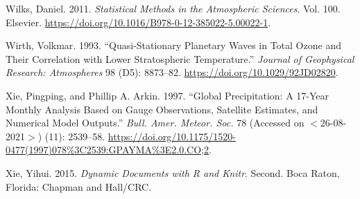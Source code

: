 \documentclass[smallextended]{svjour3}       %
\newlength{\cslhangindent}
\newlength{\cslentryspacingunit} %
\newenvironment{CSLReferences}[2] %
 {%
  \setlength{\parindent}{0pt}
  \ifodd #1
  \let\oldpar\par
  \def\par{\hangindent=\cslhangindent\oldpar}
  \fi
  \setlength{\parskip}{#2\cslentryspacingunit}
 }%
 {}
\begin{document}
\begin{CSLReferences}{1}{0}
\leavevmode{}%
Wilks, Daniel. 2011. \emph{Statistical {Methods} in the {Atmospheric Sciences}}. Vol. 100. {Elsevier}. \url{https://doi.org/10.1016/B978-0-12-385022-5.00022-1}.

\leavevmode{}%
Wirth, Volkmar. 1993. {``Quasi-Stationary Planetary Waves in Total Ozone and Their Correlation with Lower Stratospheric Temperature.''} \emph{Journal of Geophysical Research: Atmospheres} 98 (D5): 8873--82. \url{https://doi.org/10.1029/92JD02820}.

\leavevmode{}%
Xie, Pingping, and Phillip A. Arkin. 1997. {``Global {Precipitation}: {A} 17-{Year Monthly Analysis Based} on {Gauge Observations}, {Satellite Estimates}, and {Numerical Model Outputs}.''} \emph{Bull. Amer. Meteor. Soc.} 78 (Accessed on {\(<\)}26-08-2021{\(>\)}) (11): 2539--58. \url{https://doi.org/10.1175/1520-0477(1997)078\%3C2539:GPAYMA\%3E2.0.CO;2}.

\leavevmode{}%
Xie, Yihui. 2015. \emph{Dynamic Documents with {R} and Knitr}. Second. {Boca Raton, Florida}: {Chapman and Hall/CRC}.

\end{CSLReferences}




\end{document}
